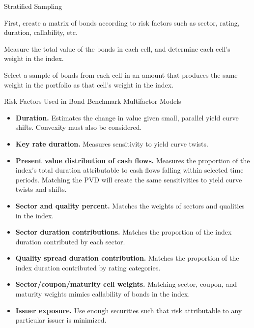 \documentclass[../custom]{flashcards}
\begin{document}
\begin{flashcard}{Stratified Sampling}
    \begin{flushleft}
        First, create a matrix of bonds according to risk factors such as sector, rating, duration, callability, etc.\newline

        Measure the total value of the bonds in each cell, and determine each cell's weight in the index.\newline

        Select a sample of bonds from each cell in an amount that produces the same weight in the portfolio as that cell's weight in the index.
    \end{flushleft}
\end{flashcard}

\begin{flashcard}{Risk Factors Used in Bond Benchmark Multifactor Models}
    \begin{itemize}
        \item \textbf{Duration.} Estimates the change in value given small, parallel yield curve shifts. Convexity must also be considered.
        \item \textbf{Key rate duration.} Measures sensitivity to yield curve twists.
        \item \textbf{Present value distribution of cash flows.} Measures the proportion of the index's total duration attributable to cash flows falling within selected time periods. Matching the PVD will create the same sensitivities to yield curve twists and shifts.
        \item \textbf{Sector and quality percent.} Matches the weights of sectors and qualities in the index.
        \item \textbf{Sector duration contributions.} Matches the proportion of the index duration contributed by each sector.
        \item \textbf{Quality spread duration contribution.} Matches the proportion of the index duration contributed by rating categories.
        \item \textbf{Sector/coupon/maturity cell weights.} Matching sector, coupon, and maturity weights mimics callability of bonds in the index.
        \item \textbf{Issuer exposure.} Use enough securities such that risk attributable to any particular issuer is minimized.
    \end{itemize}
\end{flashcard}
\end{document}
